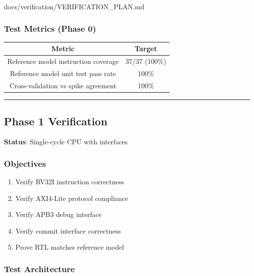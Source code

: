 \begin{relocated}{docs/verification/VERIFICATION_PLAN.md}
\subsubsection{Test Metrics (Phase 0)}\label{ds:ch:verification-plan:test-metrics-phase-0}

{
\begin{longtable}[]{@{}cc@{}}
\toprule\noalign{}
Metric & Target \\
\midrule\noalign{}
\endhead
\bottomrule\noalign{}
\endlastfoot
Reference model instruction coverage & 37/37 (100\%) \\
Reference model unit test pass rate & 100\% \\
Cross-validation vs spike agreement & 100\% \\
\end{longtable}
}

\begin{center}\rule{0.5\linewidth}{0.5pt}\end{center}

\subsection{Phase 1 Verification}\label{ds:ch:verification-plan:phase-1-verification}

\textbf{Status}: Single-cycle CPU with interfaces

\subsubsection{Objectives}\label{ds:ch:verification-plan:objectives-1}

\begin{enumerate}
\def\labelenumi{\arabic{enumi}.}
\tightlist
\item
  Verify RV32I instruction correctness
\item
  Verify AXI4-Lite protocol compliance
\item
  Verify APB3 debug interface
\item
  Verify commit interface correctness
\item
  Prove RTL matches reference model
\end{enumerate}

\subsubsection{Test Architecture}\label{ds:ch:verification-plan:test-architecture}


\end{relocated}
